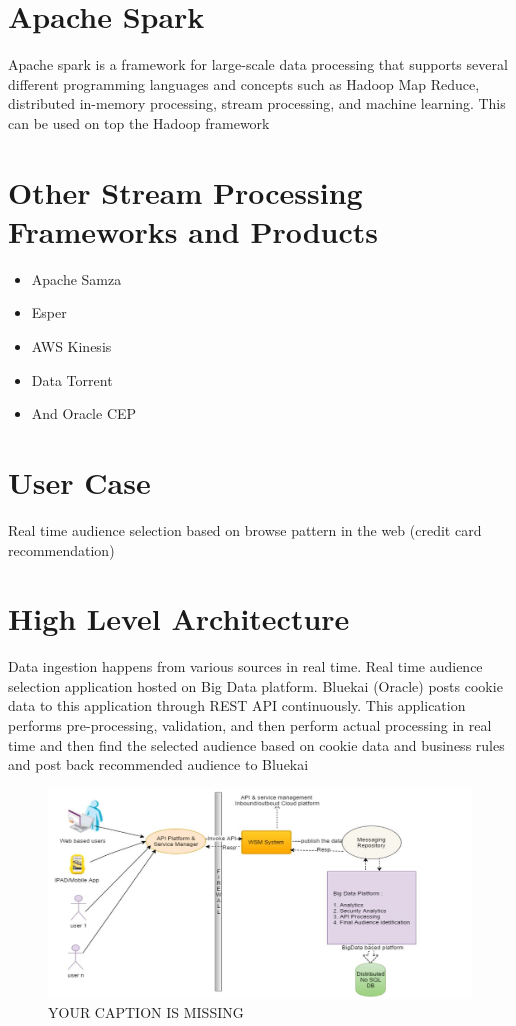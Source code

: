 \section{Apache Spark}

Apache spark is a framework for large-scale data processing that
supports several different programming languages and concepts such as
Hadoop Map Reduce, distributed in-memory processing, stream
processing, and machine learning. This can be used on top the Hadoop
framework

\section{Other Stream Processing Frameworks and Products}

\begin{itemize}
\item Apache Samza
\item Esper 
\item AWS Kinesis 
\item Data Torrent 
\item And Oracle CEP 
\end{itemize}


\section{User Case}

Real time audience selection based on browse pattern in the web
(credit card recommendation)

\section{High Level Architecture}

Data ingestion happens from various sources in real time. Real time
audience selection application hosted on Big Data platform.  Bluekai
(Oracle) posts cookie data to this application through REST API
continuously. This application performs pre-processing, validation,
and then perform actual processing in real time and then find the
selected audience based on cookie data and business rules and post
back recommended audience to Bluekai

\begin{figure}[!ht]
\centering\includegraphics[width=\columnwidth]{images/realTimeAudienceSelection.JPG}
  \caption{YOUR CAPTION IS MISSING}\label{f:hdfs-realtime}
\end{figure}


